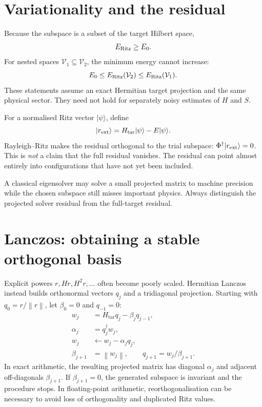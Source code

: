 \documentclass[11pt,a4paper,oneside]{report}
\newcommand{\ket}[1]{\lvert #1\rangle}
\newcommand{\norm}[1]{\left\lVert #1\right\rVert}
\newcommand{\Ht}{H_{\mathrm{tar}}}
\begin{document}
\section{Variationality and the residual}
Because the subspace is a subset of the target Hilbert space,
\begin{equation}
E_{\rm Ritz}\ge E_0.
\end{equation}
For nested spaces $\mathcal V_1\subseteq\mathcal V_2$, the minimum energy cannot increase:
\begin{equation}\label{eq:nested}
E_0\le E_{\rm Ritz}(\mathcal V_2)\le E_{\rm Ritz}(\mathcal V_1).
\end{equation}
These statements assume an exact Hermitian target projection and the same physical sector. They need not hold for separately noisy estimates of $H$ and $S$.

For a normalised Ritz vector $\ket\psi$, define
\begin{equation}
\ket{r_{\rm ext}}=\Ht\ket\psi-E\ket\psi.
\end{equation}
Rayleigh--Ritz makes the residual orthogonal to the trial subspace: $\Phi^\dagger\ket{r_{\rm ext}}=0$. This is \emph{not} a claim that the full residual vanishes. The residual can point almost entirely into configurations that have not yet been included.

\begin{idea}
A classical eigensolver may solve a small projected matrix to machine precision while the chosen subspace still misses important physics. Always distinguish the projected solver residual from the full-target residual.
\end{idea}

\section{Lanczos: obtaining a stable orthogonal basis}
Explicit powers $r,Hr,H^2r,\ldots$ often become poorly scaled. Hermitian Lanczos instead builds orthonormal vectors $q_j$ and a tridiagonal projection. Starting with $q_0=r/\norm r$, let $\beta_0=0$ and $q_{-1}=0$:
\begin{align}
w_j&=\Ht q_j-\beta_jq_{j-1},\\
\alpha_j&=q_j^\dagger w_j,\\
w_j&\leftarrow w_j-\alpha_jq_j,\\
\beta_{j+1}&=\norm{w_j},\qquad q_{j+1}=w_j/\beta_{j+1}.
\end{align}
In exact arithmetic, the resulting projected matrix has diagonal $\alpha_j$ and adjacent off-diagonals $\beta_{j+1}$. If $\beta_{j+1}=0$, the generated subspace is invariant and the procedure stops. In floating-point arithmetic, reorthogonalisation can be necessary to avoid loss of orthogonality and duplicated Ritz values.
\end{document}
